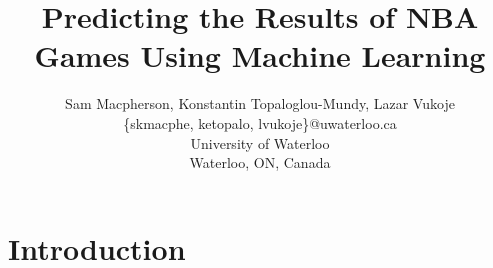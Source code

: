 \documentclass[letterpaper]{article} %
\begin{document}
%
\title{Predicting the Results of NBA Games Using Machine Learning}
\author{Sam Macpherson, Konstantin Topaloglou-Mundy, Lazar Vukoje\\
\{skmacphe, ketopalo, lvukoje\}@uwaterloo.ca\\
University of Waterloo\\
Waterloo, ON, Canada\\}
\maketitle



\section{Introduction}
\end{document}
